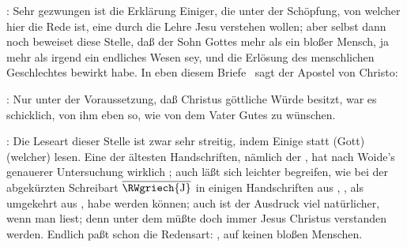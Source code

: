 \begin{aufza}
\begin{aufzc}
\item {}:  Sehr gezwungen ist die Erklärung Einiger, die unter der Schöpfung, von welcher hier die Rede ist, eine  durch die Lehre Jesu verstehen wollen; aber selbst dann noch beweiset diese Stelle, daß der Sohn Gottes mehr als ein bloßer Mensch, ja mehr als irgend ein endliches Wesen sey, und die Erlösung des menschlichen Geschlechtes bewirkt habe. In eben diesem Briefe \ sagt der Apostel von Christo: 
\item {}:  Nur unter der Voraussetzung, daß Christus göttliche Würde besitzt, war es schicklich, von ihm eben so, wie von dem Vater Gutes zu wünschen.
\item {}:  Die Leseart dieser Stelle ist zwar sehr streitig, indem Einige statt  (Gott)  (welcher) lesen. Eine der ältesten Handschriften, nämlich der , hat nach Woide's genauerer Untersuchung wirklich ; auch läßt sich leichter begreifen, wie bei der abgekürzten Schreibart $\overline{\textrm{\RWgriech{J}}}$ in einigen Handschriften aus , , als umgekehrt aus ,  habe werden können; auch ist der Ausdruck viel natürlicher, wenn man  liest; denn unter dem  müßte doch immer Jesus Christus verstanden werden. Endlich paßt schon die Redensart: , auf keinen bloßen Menschen.

\end{aufzc}
\end{aufza}
